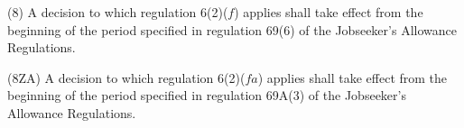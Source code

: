 \documentclass[12pt,a4paper]{article}
\begin{document}
%

%
%

(8) A decision to which regulation 6(2)($f$) applies shall take effect from the beginning of the period specified in regulation 69(6) of the Jobseeker’s Allowance Regulations.


(8ZA) A decision to which regulation 6(2)($fa$) applies shall take effect from the beginning of the period specified in regulation 69A(3) of the Jobseeker’s Allowance Regulations.
\end{document}
